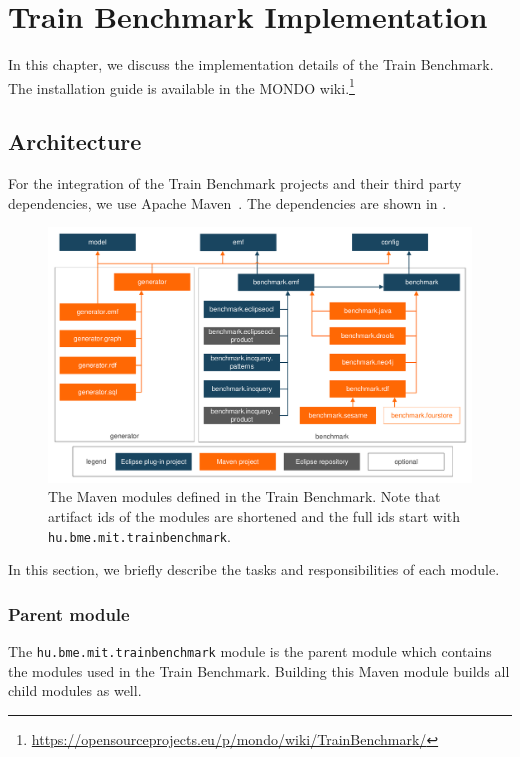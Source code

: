 \chapter{Train Benchmark Implementation}

In this chapter, we discuss the implementation details of the Train Benchmark. The installation guide is available in the MONDO wiki.\footnote{\url{https://opensourceprojects.eu/p/mondo/wiki/TrainBenchmark/}}

\section{Architecture}

For the integration of the Train Benchmark projects and their third party dependencies, we use Apache Maven~\cite{Maven}. The dependencies are shown in .

\begin{figure}[!Htb]
	\centering
	\includegraphics[width=\textwidth]{figures/trainbenchmark-modules}
	\caption{The Maven modules defined in the Train Benchmark. Note that artifact ids of the modules are shortened and the full ids start with \texttt{hu.bme.mit.trainbenchmark}.}
	\label{fig:trainbenchmark-modules}
\end{figure}

In this section, we briefly describe the tasks and responsibilities of each module.

\subsection{Parent module}

The \texttt{hu.bme.mit.trainbenchmark} module is the parent module which contains the modules used in the Train Benchmark. Building this Maven module builds all child modules as well.

